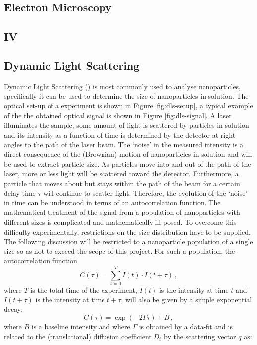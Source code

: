 \subsection{Electron Microscopy}
\subsection{IV}
\subsection{Dynamic Light Scattering}
Dynamic Light Scattering (\dls{}) is most commonly used to analyse nanoparticles, specifically it can be used to determine the size of nanoparticles in solution. The optical set-up of a \dls{} experiment is shown in Figure \ref{fig:dls-setup}, a typical example of the the obtained optical signal is shown in Figure \ref{fig:dls-signal}. A laser illuminates the sample, some amount of light is scattered by particles in solution and its intensity as a function of time is determined by the detector at right angles to the path of the laser beam. The `noise' in the measured intensity is a direct consequence of the (Brownian) motion of nanoparticles in solution and will be used to extract particle size. As particles move into and out of the path of the laser, more or less light will be scattered toward the detector. Furthermore, a particle that moves about but stays within the path of the beam for a certain delay time $\tau$ will continue to scatter light. Therefore, the evolution of the `noise' in time can be understood in terms of an autocorrelation function. The mathematical treatment of the signal from a population of nanoparticles with different sizes is complicated and mathematically ill posed. To overcome this difficulty experimentally, restrictions on the size distribution have to be supplied. The following discussion will be restricted to a nanoparticle population of a single size so as not to exceed the scope of this project. For such a population, the autocorrelation function
\begin{equation}
	C(\tau) = \sum _{t=0}^T I(t)\cdot I(t + \tau) \, ,
\end{equation}
where $T$ is the total time of the experiment, $I(t)$ is the intensity at time $t$ and $I(t + \tau)$ is the intensity at time $t+\tau$, will also be given by a simple exponential decay:
\begin{equation}
	C(\tau) = \exp (-2 \Gamma \tau) + B \, ,
\end{equation}
where $B$ is a baseline intensity and where $\Gamma$ is obtained by a data-fit and is related to the (translational) diffusion coefficient $D_t$ by the scattering vector $q$ as:
